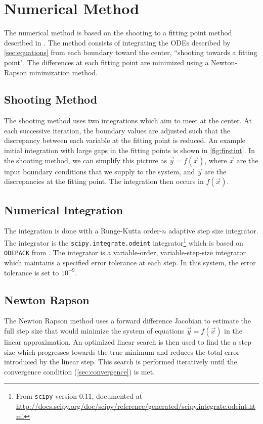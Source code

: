 \documentclass[10pt]{article}
\renewcommand{\v}[1]{\vec{#1}} %
\begin{document}
\section{Numerical Method}\label{sec:numerical}
The numerical method is based on the shooting to a fitting point method described in \citet{Press:2007tk}. The method consists of integrating the ODEs described by \cref{sec:equations} from each boundary toward the center, ``shooting towards a fitting point". The differences at each fitting point are minimized using a Newton-Rapson minimization method.
\subsection{Shooting Method}
The shooting method uses two integrations which aim to meet at the center. At each successive iteration, the boundary values are adjusted such that the discrepancy between each variable at the fitting point is reduced. An example initial integration with large gaps in the fitting points is shown in \cref{fig:firstint}. In the shooting method, we can simplify this picture as $\v{y} = f(\v{x})$, where $\v{x}$ are the input boundary conditions that we supply to the system, and $\v{y}$ are the discrepancies at the fitting point. The integration then occurs in $f(\v{x})$.

\subsection{Numerical Integration}
The integration is done with a Runge-Kutta order-$n$ adaptive step size integrator. The integrator is the \lstinline{scipy.integrate.odeint} integrator\footnote{From \lstinline{scipy} version $0.11$, documented at \url{http://docs.scipy.org/doc/scipy/reference/generated/scipy.integrate.odeint.html}} which is based on \lstinline{ODEPACK} from \citet{hindmarsh1983odepack}. The integrator is a variable-order, variable-step-size integrator which maintains a specified error tolerance at each step. In this system, the error tolerance is set to $10^{-9}$.

\subsection{Newton Rapson}
The Newton Rapson method \citep[from][]{Press:2007tk} uses a forward difference Jacobian to estimate the full step size that would minimize the system of equations $\v{y} = f(\v{x})$ in the linear approximation. An optimized linear search is then used to find the a step size which progresses towards the true minimum and reduces the total error introduced by the linear step. This search is performed iteratively until the convergence condition (\cref{sec:convergence}) is met.
\end{document}
